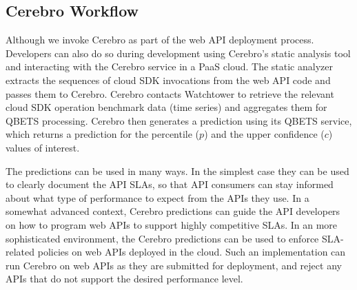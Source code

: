 \subsection{Cerebro Workflow}


Although we invoke Cerebro as part of the web API deployment process. Developers
can also do so during development using Cerebro's static analysis tool and interacting
with the Cerebro service in a PaaS cloud.
The static analyzer extracts the sequences of cloud SDK invocations from 
the web API code and passes them to Cerebro.
Cerebro contacts Watchtower 
to retrieve the relevant cloud SDK operation
benchmark data (time series) and aggregates them for QBETS processing.
Cerebro then generates a prediction using its QBETS service, which returns a prediction
for the percentile ($p$) and the upper confidence ($c$) values of interest.

The predictions can be used in many ways. In the simplest case they can be
used to clearly document the API SLAs, so that API consumers can stay informed about what 
type of performance to expect from the APIs they use. In a somewhat advanced context, 
Cerebro predictions can guide the API developers on how to program web APIs 
to support highly competitive SLAs. In an
more sophisticated environment, the Cerebro predictions can be used to 
enforce SLA-related policies on web APIs deployed in the cloud. Such an implementation
can run Cerebro on web APIs as they are submitted for deployment, 
and reject any APIs that do not
support the desired performance level.
